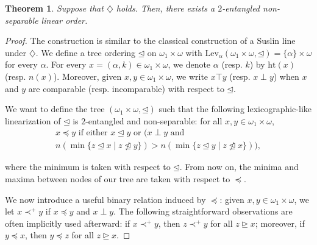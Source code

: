 \documentclass[12pt]{amsart}
\newtheorem{theorem}{Theorem}[section]
\theoremstyle{definition}
\theoremstyle{remark}
\begin{document}
\begin{theorem}
Suppose that $\diamondsuit$ holds. Then, there exists a $2$-entangled non-separable linear order.
\end{theorem}
\begin{proof}
The construction is similar to the classical construction of a Suslin line under $\diamondsuit$. We define a tree ordering $\unlhd$ on $\omega_1\times \omega$ with $\mathrm{Lev}_\alpha(\omega_1 \times \omega, \unlhd) = \{\alpha\}\times \omega$ for every $\alpha$. For every $x = (\alpha, k) \in \omega_1\times\omega$, we denote $\alpha$ (resp. $k$) by $\mathrm{ht}(x)$ (resp. $n(x)$). Moreover, given $x,y \in \omega_1\times \omega$, we write $x \top y$ (resp. $x \perp y$) when $x$ and $y$ are comparable (resp. incomparable) with respect to $\unlhd$.

We want to define the tree $(\omega_1\times \omega, \unlhd)$ such that the following lexicographic-like linearization of $\unlhd$ is $2$-entangled and non-separable: for all $x,y \in \omega_1\times \omega$,
\begin{multline*}
x \preceq y \text{ if either } x \unlhd y \text{ or } \big( x \perp y \text{ and } \\
n(\min\{z \unlhd x \mid z \not\trianglelefteq y\}) >
n(\min \{z \unlhd y \mid z \not\trianglelefteq x\})\big),
\end{multline*}

\smallskip
\noindent where the minimum is taken with respect to $\unlhd$. From now on, the minima and maxima between nodes of our tree are taken with respect to $\preceq$.

We now introduce a useful binary relation induced by $\preceq$: given $x,y \in \omega_1 \times \omega$, we let $x \prec^+ y$ if $x \preceq y$ and $x \perp y$. The following straightforward observations are often implicitly used afterward: if $x \prec^+ y$, then $z \prec^+ y$ for all $z \unrhd x$; moreover, if $y \preceq x$, then $y \preceq z$ for all $z \unrhd x$.


\end{proof}
\end{document}
